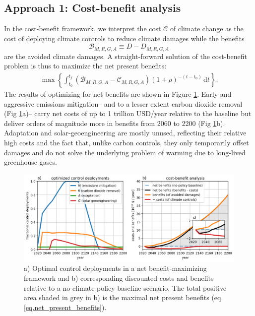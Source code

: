 \documentclass{article}
\begin{document}
\subsection{Approach 1: Cost-benefit analysis}\label{sec.cost_benefit}

In the cost-benefit framework, we interpret the cost $\mathcal{C}$ of climate change as the cost of deploying climate controls to reduce climate damages while the benefits 
\begin{equation}
    \mathcal{B}_{M, R, G, A} \equiv D-D_{M, R, G, A}
\end{equation}
are the avoided climate damages. A straight-forward solution of the cost-benefit problem is thus to maximize the net present benefits:
\begin{gather}
    \max \left\{ \int_{t_{0}}^{t_{f}} 
    \left(\mathcal{B}_{M, R, G, A} - \mathcal{C}_{M, R, G, A} \right) (1 + \rho)^{-(t-t_{0})} \, \text{d}t \right\}.
    \label{eq.net_present_benefits}
\end{gather}
The results of optimizing for net benefits are shown in Figure \ref{fig.approach1}. Early and aggressive emissions mitigation– and to a lesser extent carbon dioxide removal (Fig \ref{fig.approach1}a)– carry net costs of up to 1 trillion USD/year relative to the baseline but deliver orders of magnitude more in benefits from 2060 to 2200 (Fig \ref{fig.approach1}b). Adaptation and solar-geoengineering are mostly unused, reflecting their relative high costs and the fact that, unlike carbon controls, they only temporarily offset damages and do not solve the underlying problem of warming due to long-lived greenhouse gases.

\begin{figure}[htb!]
\noindent\includegraphics[width=1.0\textwidth]{figures/default-benefits_controls_and_benefits.png}
\centering
\caption{a) Optimal control deployments in a net benefit-maximizing framework and b) corresponding discounted costs and benefits relative to a no-climate-policy baseline scenario. The total positive area shaded in grey in b) is the maximal net present benefits (eq. \ref{eq.net_present_benefits}).}
\label{fig.approach1}
\end{figure}
\end{document}
